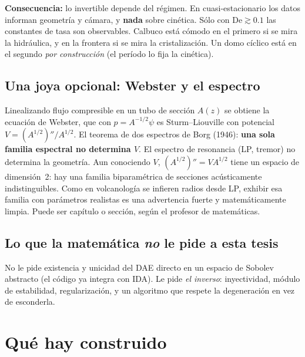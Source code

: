 \documentclass[11pt,a4paper]{article}
\theoremstyle{plain}
\theoremstyle{definition}
\theoremstyle{remark}
\begin{document}
\textbf{Consecuencia:} lo invertible depende del régimen. En
cuasi-estacionario los datos informan geometría y cámara, y
\textbf{nada} sobre cinética. Sólo con $\mathrm{De}\gtrsim 0.1$ las
constantes de tasa son observables. Calbuco está cómodo en el
primero si se mira la hidráulica, y en la frontera si se mira la
cristalización. Un domo cíclico está en el segundo \emph{por
construcción} (el período lo fija la cinética).

\subsection{Una joya opcional: Webster y el espectro}

Linealizando flujo compresible en un tubo de sección $A(z)$ se
obtiene la ecuación de Webster, que con $p=A^{-1/2}\psi$ es
Sturm--Liouville con potencial
$V=(A^{1/2})''/A^{1/2}$. El teorema de dos espectros de Borg
(1946): \textbf{una sola familia espectral no determina $V$}. El
espectro de resonancia (LP, tremor) no determina la geometría.
Aun conociendo $V$, $(A^{1/2})''=VA^{1/2}$ tiene un espacio de
dimensión~2: hay una familia biparamétrica de secciones
acústicamente indistinguibles. Como en volcanología se infieren
radios desde LP, exhibir esa familia con parámetros realistas es
una advertencia fuerte y matemáticamente limpia. Puede ser
capítulo o sección, según el profesor de matemáticas.

\subsection{Lo que la matemática \emph{no} le pide a esta tesis}

No le pide existencia y unicidad del DAE directo en un espacio de
Sobolev abstracto (el código ya integra con IDA). Le pide
\emph{el inverso}: inyectividad, módulo de estabilidad,
regularización, y un algoritmo que respete la degeneración en vez
de esconderla.

\section{Qué hay construido}
\label{sec:construido}
\end{document}
